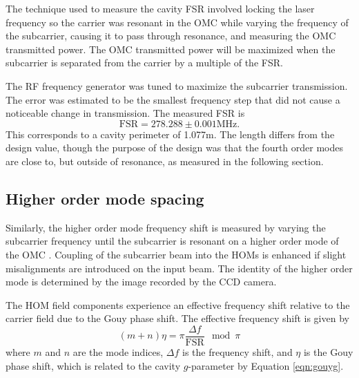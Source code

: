 The technique used to measure the cavity FSR involved locking the laser frequency so the carrier was resonant in the OMC while varying the frequency of the subcarrier, causing it to pass through resonance, and measuring the OMC transmitted power. %
The OMC transmitted power will be maximized when the subcarrier is separated from the carrier by a multiple of the FSR.

The RF frequency generator was tuned to maximize the subcarrier transmission. %
The error was estimated to be the smallest frequency step that did not cause a noticeable change in transmission. %
The measured FSR is
\begin{equation}
\mathrm{FSR}=278.288\pm0.001\text{MHz}.
\end{equation}
This corresponds to a cavity perimeter of 1.077m. %
The length differs from the design value, though the purpose of the design was that the fourth order modes are close to, but outside of resonance, as measured in the following section.

\subsection{Higher order mode spacing}
Similarly, the higher order mode frequency shift is measured by varying the subcarrier frequency until the subcarrier is resonant on a higher order mode of the OMC \cite{Uehara:95}. %
Coupling of the subcarrier beam into the HOMs is enhanced if slight misalignments are introduced on the input beam. %
The identity of the higher order mode is determined by the image recorded by the CCD camera.

The HOM field components experience an effective frequency shift relative to the  carrier field due to the Gouy phase shift. %
The effective frequency shift is given by
\begin{equation}
\label{eqn:gouyshift}
(m+n)\eta=\pi\frac{\Delta f}{\mathrm{FSR}}\mod \pi
\end{equation}
where $m$ and $n$ are the  mode indices, $\Delta f$ is the frequency shift, and $\eta$ is the Gouy phase shift, which is related to the cavity $g$-parameter by Equation \ref{eqn:gouyg}. %



